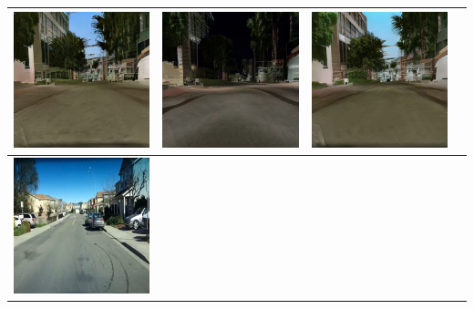 \documentclass{VUMIFPSbakalaurinis}
\begin{document}
\begin{table}[H]
{\begin{tabular}{|c|c|c|c|}
            \includegraphics[scale=0.35]{img/pvz/1_cycle_v2} & \includegraphics[scale=0.35]{img/pvz/1_cut_v2} & \includegraphics[scale=0.35]{img/pvz/1_mspc_v2}
            \\
            \hline
            \includegraphics[scale=0.35]{img/pvz/3_real} & 

\end{tabular}}
\end{table}
\end{document}
